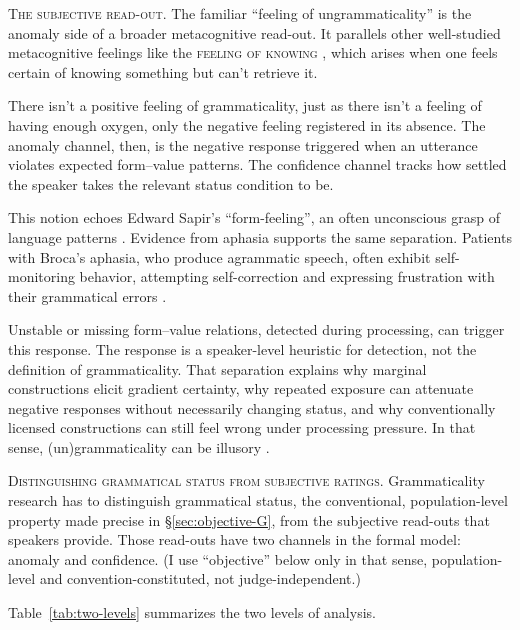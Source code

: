 \documentclass[12pt,letterpaper]{article}
\begin{document}
\noindent\textsc{The subjective read-out.} The familiar \enquote{feeling of ungrammaticality} is the anomaly side of a broader metacognitive read-out. It parallels other well-studied metacognitive feelings like the \textsc{feeling of knowing} \autocite[FOK;][]{hart1965}, which arises when one feels certain of knowing something but can't retrieve it.

There isn't a positive feeling of grammaticality, just as there isn't a feeling of having enough oxygen, only the negative feeling registered in its absence. The anomaly channel, then, is the negative response triggered when an utterance violates expected form--value patterns. The confidence channel tracks how settled the speaker takes the relevant status condition to be.

This notion echoes Edward Sapir's \enquote{form-feeling}, an often unconscious grasp of language patterns \autocite{Sapir1921, Sapir1927b}. Evidence from aphasia supports the same separation. Patients with Broca's aphasia, who produce agrammatic speech, often exhibit self-monitoring behavior, attempting self-correction and expressing frustration with their grammatical errors \autocite{oomen2005}.

Unstable or missing form--value relations, detected during processing, can trigger this response. The response is a speaker-level heuristic for detection, not the definition of grammaticality. That separation explains why marginal constructions elicit gradient certainty, why repeated exposure can attenuate negative responses without necessarily changing status, and why conventionally licensed constructions can still feel wrong under processing pressure. In that sense, (un)grammaticality can be illusory \citep{Fanselow2021}.

\noindent\textsc{Distinguishing grammatical status from subjective ratings.} Grammaticality research has to distinguish grammatical status, the conventional, population-level property made precise in \S\ref{sec:objective-G}, from the subjective read-outs that speakers provide. Those read-outs have two channels in the formal model: anomaly and confidence. (I use \enquote{objective} below only in that sense, population-level and convention-constituted, not judge-independent.)

Table~\ref{tab:two-levels} summarizes the two levels of analysis.
\end{document}
